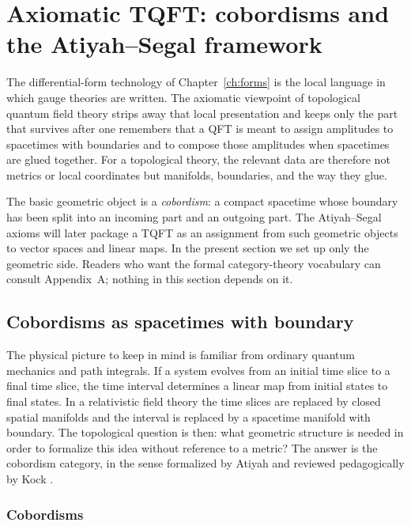 \chapter{Axiomatic TQFT: cobordisms and the Atiyah--Segal framework}\label{ch:axiomatic}

The differential-form technology of Chapter~\ref{ch:forms} is the local language in which gauge theories are written. The axiomatic viewpoint of topological quantum field theory strips away that local presentation and keeps only the part that survives after one remembers that a QFT is meant to assign amplitudes to spacetimes with boundaries and to compose those amplitudes when spacetimes are glued together. For a topological theory, the relevant data are therefore not metrics or local coordinates but manifolds, boundaries, and the way they glue.

\medskip

\noindent The basic geometric object is a \emph{cobordism}: a compact spacetime whose boundary has been split into an incoming part and an outgoing part. The Atiyah--Segal axioms will later package a TQFT as an assignment from such geometric objects to vector spaces and linear maps. In the present section we set up only the geometric side. Readers who want the formal category-theory vocabulary can consult Appendix~A; nothing in this section depends on it.

\section{Cobordisms as spacetimes with boundary}\label{sec:cobordism-category}

The physical picture to keep in mind is familiar from ordinary quantum mechanics and path integrals. If a system evolves from an initial time slice to a final time slice, the time interval determines a linear map from initial states to final states. In a relativistic field theory the time slices are replaced by closed spatial manifolds and the interval is replaced by a spacetime manifold with boundary. The topological question is then: what geometric structure is needed in order to formalize this idea without reference to a metric? The answer is the cobordism category, in the sense formalized by Atiyah and reviewed pedagogically by Kock \cite{Atiyah1988TQFT,Kock2004Frobenius}.

\subsection{Cobordisms}


